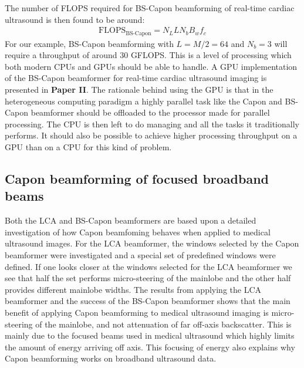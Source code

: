 The number of FLOPS required for BS-Capon beamforming of real-time cardiac ultrasound is then found to be around:
\begin{align}
\text{FLOPS}_{\text{BS-Capon}} = N_LLN_bB_wf_c
\end{align}
For our example, BS-Capon beamforming with $L=M/2=64$ and $N_b=3$ will require a throughput of around $30$ GFLOPS. This is a level of processing which both modern CPUs and GPUs should be able to handle. A GPU implementation of the BS-Capon beamformer for real-time cardiac ultrasound imaging is presented in \textbf{Paper II}. The rationale behind using the GPU is that in the heterogeneous computing paradigm a highly parallel task like the Capon and BS-Capon beamformer should be offloaded to the processor made for parallel processing. The CPU is then left to do managing and all the tasks it traditionally performs. It should also be possible to achieve higher processing throughput on a GPU than on a CPU for this kind of problem.

\subsection{Capon beamforming of focused broadband beams}
Both the LCA and BS-Capon beamformers are based upon a detailed investigation of how Capon beamfoming behaves when applied to medical ultrasound images. For the LCA beamformer, the windows selected by the Capon beamformer were investigated and a special set of predefined windows were defined. If one looks closer at the windows selected for the LCA beamformer we see that half the set performs micro-steering of the mainlobe and the other half provides different mainlobe widths. The results from applying the LCA beamformer \cite[Fig.\,9]{Synnevag2011} and the success of the BS-Capon beamformer shows that the main benefit of applying Capon beamforming to medical ultrasound imaging is micro-steering of the mainlobe, and not attenuation of far off-axis backscatter. This is mainly due to the focused beams used in medical ultrasound which highly limits the amount of energy arriving off axis. This focusing of energy also explains why Capon beamforming works on broadband ultrasound data.

